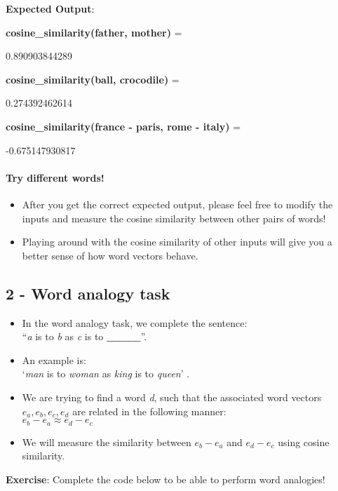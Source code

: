 \documentclass[11pt]{article}
\begin{document}
    \textbf{Expected Output}:

\textbf{cosine\_similarity(father, mother)} =

0.890903844289

\textbf{cosine\_similarity(ball, crocodile)} =

0.274392462614

\textbf{cosine\_similarity(france - paris, rome - italy)} =

-0.675147930817

    \paragraph{Try different words!}\label{try-different-words}

\begin{itemize}
\itemsep1pt\parskip0pt
\item
  After you get the correct expected output, please feel free to modify
  the inputs and measure the cosine similarity between other pairs of
  words!
\item
  Playing around with the cosine similarity of other inputs will give
  you a better sense of how word vectors behave.
\end{itemize}

    \subsection{2 - Word analogy task}\label{word-analogy-task}

\begin{itemize}
\item
  In the word analogy task, we complete the sentence:\\``\emph{a} is to
  \emph{b} as \emph{c} is to \textbf{\_\_\_\_}''.
\item
  An example is:\\ `\emph{man} is to \emph{woman} as \emph{king} is to
  \emph{queen}' .
\item
  We are trying to find a word \emph{d}, such that the associated word
  vectors $e_a, e_b, e_c, e_d$ are related in the following
  manner:\\$e_b - e_a \approx e_d - e_c$
\item
  We will measure the similarity between $e_b - e_a$ and $e_d - e_c$
  using cosine similarity.
\end{itemize}

\textbf{Exercise}: Complete the code below to be able to perform word
analogies!
\end{document}

